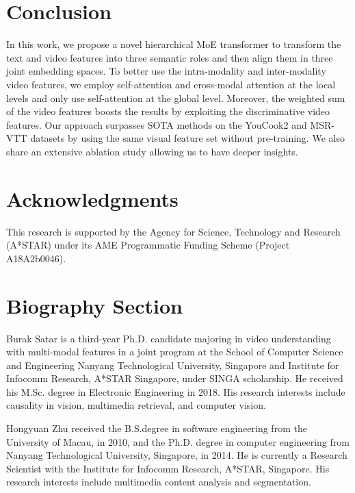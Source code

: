 \documentclass[lettersize,journal]{IEEEtran}
\begin{document}
\section{Conclusion}
 
In this work, we propose a novel hierarchical MoE transformer to transform the text and video features into three semantic roles and then align them in three joint embedding spaces. To better use the intra-modality and inter-modality video features, we employ self-attention and cross-modal attention at the local levels and only use self-attention at the global level. Moreover, the weighted sum of the video features boosts the results by exploiting the discriminative video features. Our approach surpasses SOTA methods on the YouCook2 and MSR-VTT datasets by using the same visual feature set without pre-training. We also share an extensive ablation study allowing us to have deeper insights. 

\section*{Acknowledgments}
This research is supported by the Agency for Science, Technology and Research (A*STAR) under its AME Programmatic Funding Scheme (Project A18A2b0046).




\newpage

\section{Biography Section}

\vspace{1pt}

\begin{IEEEbiography}{Burak Satar} is a third-year Ph.D. candidate majoring in video understanding with multi-modal features in a joint program at the School of Computer Science and Engineering Nanyang Technological University, Singapore and Institute for Infocomm Research, A*STAR Singapore, under SINGA scholarship. He received his M.Sc. degree in Electronic Engineering in 2018. His research interests include causality in vision, multimedia retrieval, and computer vision.
\end{IEEEbiography}

\begin{IEEEbiography}{Hongyuan Zhu} received the B.S.degree in software engineering from the University of Macau, in 2010, and the Ph.D. degree in computer engineering from Nanyang Technological University, Singapore, in 2014. He is currently a Research Scientist with the Institute for Infocomm Research, A*STAR, Singapore. His research interests include multimedia content analysis and segmentation.
\end{IEEEbiography}
\end{document}
